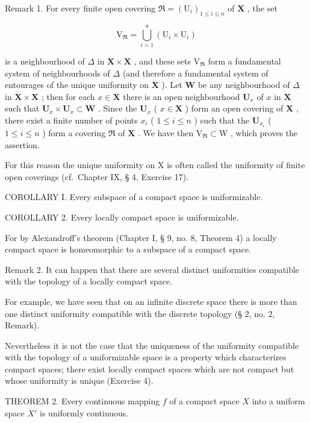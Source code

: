 Remark 1. For every finite open covering \(\Re = (\mathrm{U}_i)_{1\leqslant i\leqslant n}\) of \(\mathbf{X}\) , the set

\[
\mathrm{V} _ {\Re} = \bigcup_ {i = 1} ^ {n} \left(\mathrm{U} _ {i} \times \mathrm{U} _ {i}\right)
\]

is a neighbourhood of \(\Delta\) in \(\mathbf{X} \times \mathbf{X}\) , and these sets \(\mathrm{V}_{\Re}\) form a fundamental system of neighbourhoods of \(\Delta\) (and therefore a fundamental system of entourages of the unique uniformity on \(\mathbf{X}\) ). Let \(\mathbf{W}\) be any neighbourhood of \(\Delta\) in \(\mathbf{X} \times \mathbf{X}\) ; then for each \(x \in \mathbf{X}\) there is an open neighbourhood \(\mathbf{U}_x\) of \(x\) in \(\mathbf{X}\) such that \(\mathbf{U}_x \times \mathbf{U}_x \subset \mathbf{W}\) . Since the \(\mathbf{U}_x\) ( \(x \in \mathbf{X}\) ) form an open covering of \(\mathbf{X}\) , there exist a finite number of points \(x_i\) ( \(1 \leqslant i \leqslant n\) ) such that the \(\mathbf{U}_{x_i}\) ( \(1 \leqslant i \leqslant n\) ) form a covering \(\Re\) of \(\mathbf{X}\) . We have then \(\mathrm{V}_{\Re} \subset \mathrm{W}\) , which proves the assertion.

For this reason the unique uniformity on X is often called the uniformity of finite open coverings (cf.~Chapter IX, § 4, Exercise 17).

COROLLARY I. Every subspace of a compact space is uniformizable.

COROLLARY 2. Every locally compact space is uniformizable.

For by Alexandroff's theorem (Chapter I, § 9, no. 8, Theorem 4) a locally compact space is homeomorphic to a subspace of a compact space.

Remark 2. It can happen that there are several distinct uniformities compatible with the topology of a locally compact space.

For example, we have seen that on an infinite discrete space there is more than one distinct uniformity compatible with the discrete topology (§ 2, no. 2, Remark).

Nevertheless it is not the case that the uniqueness of the uniformity compatible with the topology of a uniformizable space is a property which characterizes compact spaces; there exist locally compact spaces which are not compact but whose uniformity is unique (Exercise 4).

THEOREM 2. Every continuous mapping \(f\) of a compact space \(X\) into a uniform space \(X'\) is uniformly continuous.

